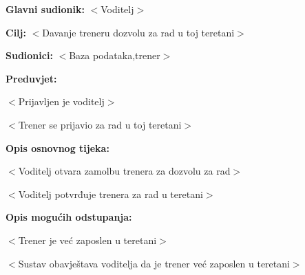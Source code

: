 					\noindent {}
					\begin{packed_item}
	
						\item \textbf{Glavni sudionik: } $<$Voditelj$>$
						\item  \textbf{Cilj:} $<$Davanje treneru dozvolu za rad u toj teretani$>$
						\item  \textbf{Sudionici:} $<$Baza podataka,trener$>$
						\item  \textbf{Preduvjet:}
						\item[] \begin{packed_enum}
	
							\item $<$Prijavljen je voditelj$>$
							\item $<$Trener se prijavio za rad u toj teretani$>$

						\end{packed_enum}
						\item  \textbf{Opis osnovnog tijeka:}
						
						\item[] \begin{packed_enum}
	
							\item $<$Voditelj otvara zamolbu trenera za dozvolu za rad$>$
							\item $<$Voditelj  potvrđuje trenera za rad u teretani$>$
						\end{packed_enum}
						
						\item  \textbf{Opis mogućih odstupanja:}
						
						\item[] \begin{packed_item}
	
							\item[1.] $<$Trener je već zaposlen u teretani$>$
							\item[] \begin{packed_enum}
								
								\item[a)] $<$Sustav obavještava voditelja da je trener već zaposlen u teretani$>$
		
								
							\end{packed_enum}
	
							
						\end{packed_item}
					\end{packed_item}
					
